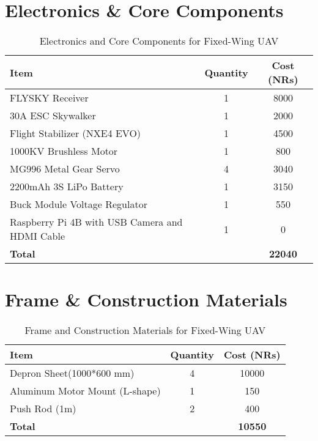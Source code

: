  
\section*{Electronics \& Core Components}
\begin{table}[h]
\centering
\begin{tabular}{l c S[table-format=5.0]}
\toprule
\textbf{Item} & \textbf{Quantity} & \textbf{Cost (NRs)} \\
\midrule
FLYSKY Receiver & 1 & 8000 \\
30A ESC Skywalker & 1 & 2000 \\
Flight Stabilizer (NXE4 EVO) & 1 & 4500 \\
1000KV Brushless Motor & 1 & 800 \\
MG996 Metal Gear Servo & 4 & 3040 \\
2200mAh 3S LiPo Battery & 1 & 3150 \\
Buck Module Voltage Regulator & 1 & 550 \\
Raspberry Pi 4B with USB Camera and HDMI Cable & 1 & 0 \\
\midrule
\textbf{Total} & & \textbf{22040} \\
\bottomrule
\end{tabular}
\caption{Electronics and Core Components for Fixed-Wing UAV}
\end{table}

\section*{Frame \& Construction Materials}
\begin{table}[h]
\centering
\begin{tabular}{l c S[table-format=5.0]}
\toprule
\textbf{Item} & \textbf{Quantity} & \textbf{Cost (NRs)} \\
\midrule
Depron Sheet(1000*600 mm) & 4 & 10000 \\
Aluminum Motor Mount (L-shape) & 1 & 150 \\
Push Rod (1m) & 2 & 400 \\
\midrule
\textbf{Total} & & \textbf{10550} \\
\bottomrule
\end{tabular}
\caption{Frame and Construction Materials for Fixed-Wing UAV}
\end{table}

\newpage
